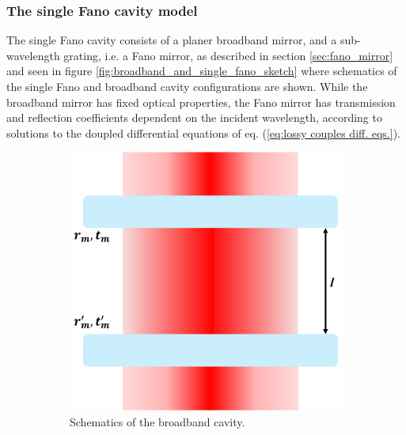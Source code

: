 \subsubsection{The single Fano cavity model}

The single Fano cavity consists of a planer broadband mirror, and a sub-wavelength grating, i.e. a Fano mirror, as described in section \ref{sec:fano_mirror} and seen in figure \ref{fig:broadband_and_single_fano_sketch} where schematics of the single Fano and broadband cavity configurations are shown. While the broadband mirror has fixed optical properties, the Fano mirror has transmission and reflection coefficients dependent on the incident wavelength, according to solutions to the doupled differential equations of eq. (\ref{eq:lossy couples diff. eqs.}). 

\begin{figure}[h!]
    \centering
    \begin{subfigure}[b]{0.3\textwidth}
        \includegraphics[width=\textwidth]{figures/broadband_sketch.pdf}
        \caption{Schematics of the broadband cavity.}
        \label{fig:broadband_sketch}
    \end{subfigure}
    \hspace{1cm}
    \begin{subfigure}[b]{0.3\textwidth}

\end{subfigure}
\end{figure}
